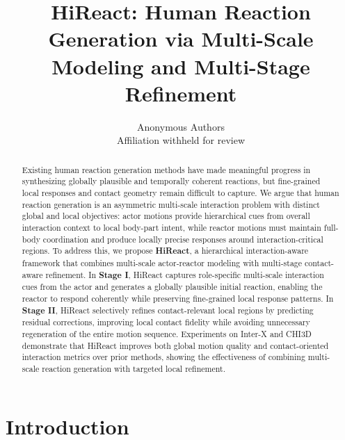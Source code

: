 \documentclass{article}
\title{HiReact: Human Reaction Generation via Multi-Scale Modeling and Multi-Stage Refinement}
\author{
Anonymous Authors \\
Affiliation withheld for review
}
\begin{document}
\maketitle

\begin{abstract}

Existing human reaction generation methods have made meaningful progress in synthesizing globally plausible and temporally coherent reactions, but fine-grained local responses and contact geometry remain difficult to capture. We argue that human reaction generation is an asymmetric multi-scale interaction problem with distinct global and local objectives: actor motions provide hierarchical cues from overall interaction context to local body-part intent, while reactor motions must maintain full-body coordination and produce locally precise responses around interaction-critical regions. To address this, we propose \textbf{HiReact}, a hierarchical interaction-aware framework that combines multi-scale actor-reactor modeling with multi-stage contact-aware refinement. In \textbf{Stage I}, HiReact captures role-specific multi-scale interaction cues from the actor and generates a globally plausible initial reaction, enabling the reactor to respond coherently while preserving fine-grained local response patterns. In \textbf{Stage II}, HiReact selectively refines contact-relevant local regions by predicting residual corrections, improving local contact fidelity while avoiding unnecessary regeneration of the entire motion sequence. Experiments on Inter-X and CHI3D demonstrate that HiReact improves both global motion quality and contact-oriented interaction metrics over prior methods, showing the effectiveness of combining multi-scale reaction generation with targeted local refinement.

\end{abstract}






\section{Introduction}
\end{document}
